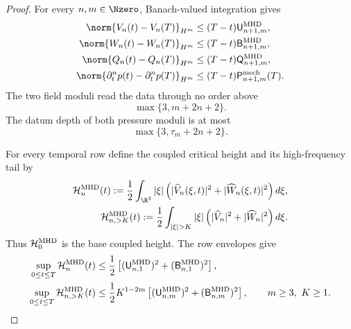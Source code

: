 \begin{proof}
For every \(n,m\in\Nzero\), Banach-valued integration gives
\begin{align}
 \norm{V_n(t)-V_n(T)}_{H^m}
 &\le(T-t)\mathsf U_{n+1,m}^{\rm MHD},
 \label{eq:mhd-velocity-endpoint}\\
 \norm{W_n(t)-W_n(T)}_{H^m}
 &\le(T-t)\mathsf B_{n+1,m}^{\rm MHD},
 \label{eq:mhd-magnetic-endpoint}\\
 \norm{Q_n(t)-Q_n(T)}_{H^m}
 &\le(T-t)\mathsf Q_{n+1,m}^{\rm MHD},
 \label{eq:mhd-pressure-endpoint}\\
 \norm{\partial_t^np(t)-\partial_t^np(T)}_{H^m}
 &\le(T-t)\mathsf P_{n+1,m}^{\rm mech}(T).
 \label{eq:mhd-mechanical-pressure-endpoint}
\end{align}
The two field moduli read the data through no order above
\begin{equation}
 \max\{3,m+2n+2\}.
 \label{eq:mhd-field-endpoint-ledger}
\end{equation}
The datum depth of both pressure moduli is at most
\begin{equation}
 \max\{3,\tau_m+2n+2\}.
 \label{eq:mhd-pressure-endpoint-ledger}
\end{equation}

For every temporal row define the coupled critical height and its
high-frequency tail by
\begin{align}
 \mathcal H_n^{\rm MHD}(t)
 :=\frac12\int_{\R^3}|\xi|
 \left(|\widehat V_n(\xi,t)|^2+|\widehat W_n(\xi,t)|^2\right)d\xi,
 \label{eq:mhd-critical-height}\\
 \mathcal H_{n,>K}^{\rm MHD}(t)
 :=\frac12\int_{|\xi|>K}|\xi|
 \left(|\widehat V_n|^2+|\widehat W_n|^2\right)d\xi.
 \label{eq:mhd-critical-tail}
\end{align}
Thus \(\mathcal H_0^{\rm MHD}\) is the base coupled height.  The row
envelopes give
\begin{align}
 \sup_{0\le t\le T}\mathcal H_n^{\rm MHD}(t)
 &\le\frac12\left[
  (\mathsf U_{n,1}^{\rm MHD})^2
  +(\mathsf B_{n,1}^{\rm MHD})^2
 \right],
 \label{eq:mhd-critical-height-bound}\\
 \sup_{0\le t\le T}\mathcal H_{n,>K}^{\rm MHD}(t)
 &\le\frac12K^{1-2m}\left[
  (\mathsf U_{n,m}^{\rm MHD})^2
  +(\mathsf B_{n,m}^{\rm MHD})^2
 \right],
 \qquad m\ge3,\ K\ge1.
 \label{eq:mhd-frequency-tail}
\end{align}


\end{proof}
